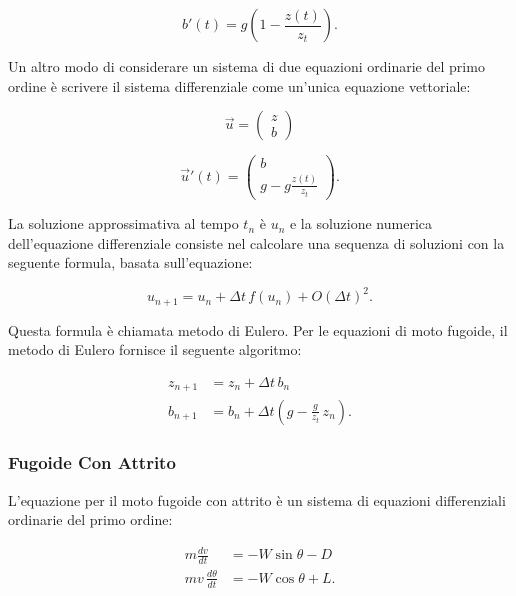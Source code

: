\begin{equation}
b'(t) = g\left(1-\frac{z(t)}{z_t}\right).
\end{equation}

\noindent
Un altro modo di considerare un sistema di due equazioni ordinarie del primo ordine è scrivere il sistema differenziale come un’unica equazione vettoriale:

\begin{equation}
\vec{u}  = \begin{pmatrix} z \\ b \end{pmatrix}
\end{equation}

\begin{equation}
\vec{u}'(t)  = \begin{pmatrix} b\\ g-g\frac{z(t)}{z_t} \end{pmatrix}.
\end{equation}

\noindent
La soluzione approssimativa al tempo $t_n$ è $u_n$ e la soluzione numerica dell’equazione differenziale consiste nel calcolare una sequenza di soluzioni con la seguente formula, basata sull’equazione:

\begin{equation}
u_{n+1} = u_n + \Delta t \,f(u_n) + O(\Delta t)^2.
\end{equation}

\noindent
Questa formula è chiamata metodo di Eulero. Per le equazioni di moto fugoide, il metodo di Eulero fornisce il seguente algoritmo:

\begin{align}
z_{n+1} & = z_n + \Delta t \, b_n \\
b_{n+1} & = b_n + \Delta t \left(g - \frac{g}{z_t} \, z_n \right).
\end{align}

\subsubsection*{Fugoide Con Attrito}
L’equazione per il moto fugoide con attrito è un sistema di equazioni differenziali ordinarie del primo ordine: 

\begin{align}
m \frac{dv}{dt} & = - W \sin\theta - D \\
m v \, \frac{d\theta}{dt} & = - W \cos\theta + L.
\end{align}

